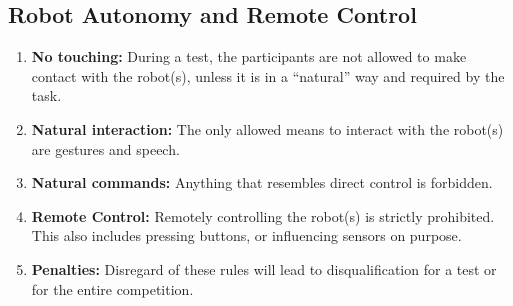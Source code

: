 \subsection{Robot Autonomy and Remote Control}
\begin{enumerate}
	\item \textbf{No touching:} During a test, the participants are not allowed to make contact with the robot(s), unless it is in a \enquote{natural} way and required by the task.

	\item \textbf{Natural interaction:} The only allowed means to interact with the robot(s) are gestures and speech.

	\item \textbf{Natural commands:} Anything that resembles direct control is forbidden.

	\item \textbf{Remote Control:} Remotely controlling the robot(s) is strictly prohibited.
	This also includes pressing buttons, or influencing sensors on purpose.

	\item \textbf{Penalties:} Disregard of these rules will lead to disqualification for a test or for the entire competition.
\end{enumerate}



